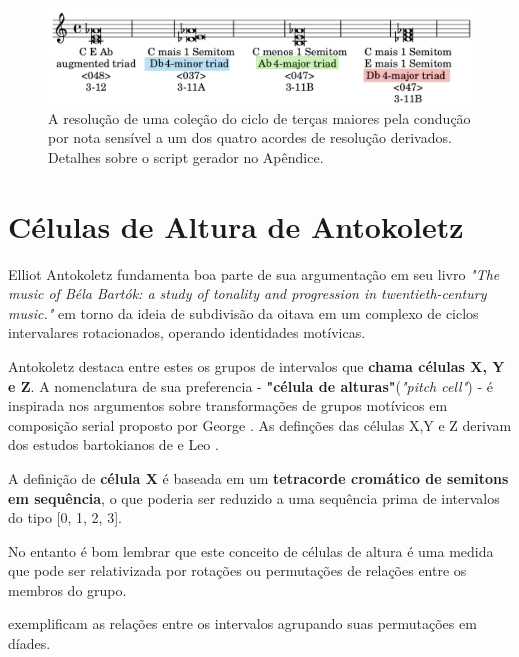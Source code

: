 \documentclass[
	12pt,				%
	openright,			%
	twoside,			%
	a4paper,			%
	english,			%
	french,				%
	spanish,			%
	brazil				%
	]{abntex2}
\begin{document}
\begin{figure}[!h]
	\caption{\label{fig_grafico}A resolução de uma coleção do ciclo de terças maiores pela condução por nota sensível a um dos quatro acordes de resolução derivados. Detalhes sobre o script gerador no Apêndice.   }
	\begin{center}
	    \includegraphics[scale=0.3]{ciclos/transpoe_triades_aumentadas.png}
	\end{center}
\end{figure}
\pagebreak



\section{Células de Altura de Antokoletz}
\label{celZ}

Elliot Antokoletz fundamenta boa parte de sua argumentação em seu livro \textit{"The music of Béla Bartók: a study of tonality and progression in twentieth-century music."}\cite{antokoletz1984music} em torno da ideia de subdivisão da oitava em um complexo de ciclos intervalares rotacionados, operando identidades motívicas. 

Antokoletz destaca entre estes os grupos de intervalos que \textbf{chama células X, Y e Z}\cite[p. 69-77]{antokoletz1984music}. A nomenclatura de sua preferencia - \textbf{"célula de alturas"}(\textit{"pitch cell"}) - é inspirada nos argumentos sobre transformações de grupos motívicos em composição serial proposto por George . As definções das células X,Y e Z derivam dos estudos bartokianos de  e Leo .

A definição de \textbf{célula X } é baseada em um \textbf{tetracorde cromático de semitons em sequência}, o que poderia ser reduzido a uma sequência prima de intervalos do tipo [0, 1, 2, 3]. 

No entanto é bom lembrar que este conceito de células de altura é uma medida que pode ser relativizada por rotações ou permutações de relações entre os membros do grupo.

 exemplificam as relações entre os intervalos agrupando suas permutações em díades.
\end{document}
